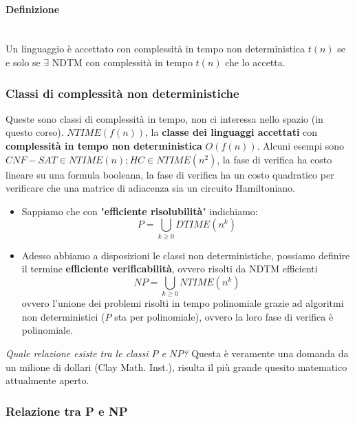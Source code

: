 \documentclass{article}
\begin{document}
\paragraph{Definizione}\mbox{}\\
Un linguaggio è accettato con complessità in tempo non deterministica $t(n)$ se e solo se
$\exists$ NDTM con complessità in tempo $t(n)$ che lo accetta.

\subsubsection{Classi di complessità non deterministiche}
Queste sono classi di complessità in tempo, non ci interessa nello spazio (in questo
corso).
\newline\newline
$NTIME(f(n))$, la \textbf{classe dei linguaggi accettati} con \textbf{complessità in tempo non deterministica}
$O(f(n))$.
\newline\newline
Alcuni esempi sono $CNF-SAT\in NTIME(n);HC\in NTIME(n^2)$, la fase
di verifica ha costo lineare su una formula booleana, la fase di verifica ha un costo
quadratico per verificare che una matrice di adiacenza sia un circuito Hamiltoniano.

\begin{itemize}
    \item Sappiamo che con "\textbf{efficiente risolubilità}" indichiamo:
          $$P=\bigcup_{k\geq 0}DTIME(n^k)$$
    \item Adesso abbiamo a disposizioni le classi non deterministiche, possiamo
          definire il termine \textbf{efficiente verificabilità}, ovvero risolti da NDTM
          efficienti
          $$NP=\bigcup_{k\geq 0}NTIME(n^k)$$
          ovvero l'unione dei problemi risolti in tempo polinomiale grazie ad algoritmi non
          deterministici ($P$ sta per polinomiale), ovvero la loro fase di verifica è polinomiale.
\end{itemize}
\textit{Quale relazione esiste tra le classi $P$ e $NP$?} Questa è veramente una domanda
da un milione di dollari (Clay Math. Inst.), risulta il più grande quesito matematico
attualmente aperto.

\subsubsection{Relazione tra P e NP}
\end{document}
